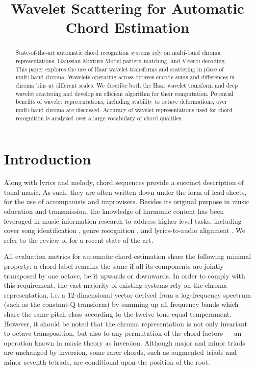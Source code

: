 \documentclass{article}
\title{Wavelet Scattering for Automatic Chord Estimation}
\makeatletter
\newcommand*{\ie}{i.e.\@\xspace}
\makeatother
\begin{document}
%
\maketitle
%
\begin{abstract}
State-of-the-art automatic chord recognition systems rely on multi-band chroma representations,
Gaussian Mixture Model pattern matching, and Viterbi decoding.
This paper explores the use of Haar wavelet transforms and scattering in place of multi-band
chroma. Wavelets operating across octaves encode sums and differences in chroma bins at
different scales.
We describe both the Haar wavelet transform and deep wavelet scattering and develop an
efficient algorithm for their computation. Potential benefits of wavelet representations,
including stability to octave deformations, over multi-band chroma are discussed.
Accuracy of wavelet representations used for chord recognition is analyzed over a large
vocabulary of chord qualities.
\end{abstract}

\section{Introduction}\label{sec:introduction}
Along with lyrics and melody, chord sequences provide a succinct description of tonal music.
As such, they are often written down under the form of lead sheets, for the use of
accompanists and improvisers.
Besides its original purpose in music education and transmission, the knowledge of
harmonic content has been leveraged in music information research to address higher-level
tasks, including cover song identification \cite{ellis2007identifying},
genre recognition \cite{perez2009genre}, and lyrics-to-audio alignment
\cite{mauch2012integrating}. We refer to the review of
\cite{mcvicar2014automatic} for a recent state of the art.

All evaluation metrics for automatic
chord estimation share the following minimal property:
a chord label remains the same if all its components are jointly
transposed by one octave, be it upwards or downwards.
In order to comply with this requirement, the vast majority of existing
systems rely on the chroma representation, \ie a 12-dimensional vector
derived from a log-frequency spectrum
(such as the constant-Q transform) by summing up all
frequency bands which share the same pitch class according to
the twelve-tone equal temperament.
However, it should be noted that the chroma representation is not
only invariant to octave transposition, but also to any permutation
of the chord factors --- an operation known in music theory
as inversion.
Although major and minor triads are unchanged by inversion,
some rarer chords, such as augmented triads and minor seventh
tetrads, are conditional upon the position of the root.
\end{document}
